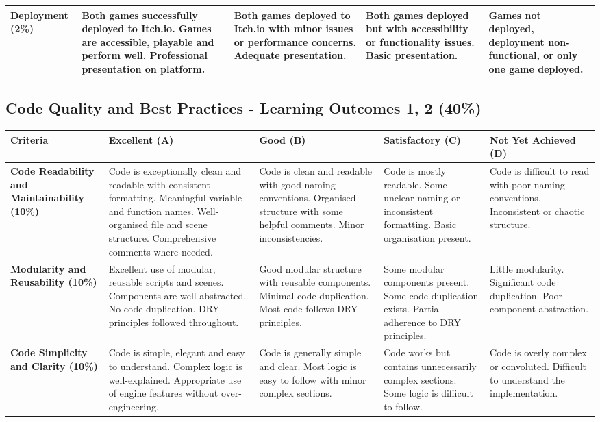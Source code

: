 \documentclass{article}
\begin{document}
\begin{landscape}
\begin{tabular}{|p{5cm}|p{4cm}|p{4cm}|p{4cm}|p{4cm}|}
\textbf{Deployment (2\%)} & 
Both games successfully deployed to Itch.io. Games are accessible, playable and perform well. Professional presentation on platform. & 
Both games deployed to Itch.io with minor issues or performance concerns. Adequate presentation. & 
Both games deployed but with accessibility or functionality issues. Basic presentation. & 
Games not deployed, deployment non-functional, or only one game deployed. \\ \hline

\end{tabular}

\subsection*{Code Quality and Best Practices - Learning Outcomes 1, 2 (40\%)}

\begin{tabular}{|p{5cm}|p{4cm}|p{4cm}|p{4cm}|p{4cm}|}
\hline
\textbf{Criteria} & \textbf{Excellent (A)} & \textbf{Good (B)} & \textbf{Satisfactory (C)} & \textbf{Not Yet Achieved (D)} \\ \hline

\textbf{Code Readability and Maintainability (10\%)} & 
Code is exceptionally clean and readable with consistent formatting. Meaningful variable and function names. Well-organised file and scene structure. Comprehensive comments where needed. & 
Code is clean and readable with good naming conventions. Organised structure with some helpful comments. Minor inconsistencies. & 
Code is mostly readable. Some unclear naming or inconsistent formatting. Basic organisation present. & 
Code is difficult to read with poor naming conventions. Inconsistent or chaotic structure. \\ \hline

\textbf{Modularity and Reusability (10\%)} & 
Excellent use of modular, reusable scripts and scenes. Components are well-abstracted. No code duplication. DRY principles followed throughout. & 
Good modular structure with reusable components. Minimal code duplication. Most code follows DRY principles. & 
Some modular components present. Some code duplication exists. Partial adherence to DRY principles. & 
Little modularity. Significant code duplication. Poor component abstraction. \\ \hline

\textbf{Code Simplicity and Clarity (10\%)} & 
Code is simple, elegant and easy to understand. Complex logic is well-explained. Appropriate use of engine features without over-engineering. & 
Code is generally simple and clear. Most logic is easy to follow with minor complex sections. & 
Code works but contains unnecessarily complex sections. Some logic is difficult to follow. & 
Code is overly complex or convoluted. Difficult to understand the implementation. \\ \hline


\end{tabular}
\end{landscape}
\end{document}
